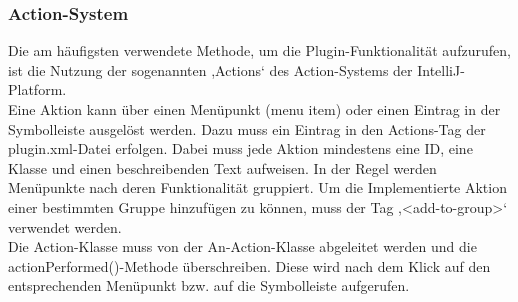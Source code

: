 	\subsubsection*{Action-System}
	Die am häufigsten verwendete Methode, um die Plugin-Funktionalität aufzurufen, ist die Nutzung der sogenannten ,Actions‘ des Action-Systems der IntelliJ-Platform.\\
	Eine Aktion kann über einen Menüpunkt (menu item) oder einen Eintrag in der Symbolleiste ausgelöst werden. Dazu muss ein Eintrag in den Actions-Tag der plugin.xml-Datei erfolgen. Dabei muss jede Aktion mindestens eine ID, eine Klasse und einen beschreibenden Text aufweisen. In der Regel werden Menüpunkte nach deren Funktionalität gruppiert. Um die Implementierte Aktion einer bestimmten Gruppe hinzufügen zu können, muss der Tag ,<add-to-group>‘ verwendet werden.\\
	Die Action-Klasse muss von der An-Action-Klasse abgeleitet werden und die actionPerformed()-Methode überschreiben. Diese wird nach dem Klick auf den entsprechenden Menüpunkt bzw. auf die Symbolleiste aufgerufen.
	
	
	
	
	
	

